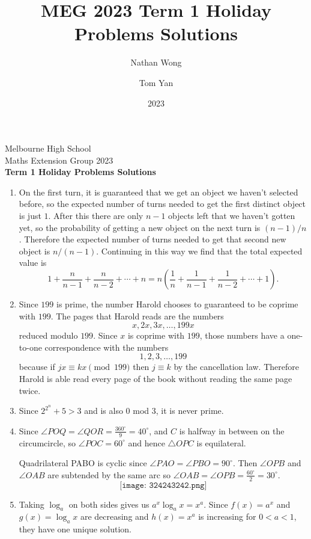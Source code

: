 \documentclass[a4paper]{article}
\title{MEG 2023 Term 1 Holiday Problems Solutions}
\author{Nathan Wong\and Tom Yan}
\date{2023}
\begin{document}
\noindent Melbourne High School\\
Maths Extension Group 2023\\
\textbf{Term 1 Holiday Problems Solutions}\\

\begin{enumerate}
\item On the first turn, it is guaranteed that we get an object we haven't selected before, so the expected number of turns needed to get the
  first distinct object is just \(1\). After this there are only \(n-1\) objects left that we haven't gotten yet, so the probability of getting
  a new object on the next turn is \((n-1)/n\). Therefore the expected number of turns needed to get that second new object is \(n/(n-1)\). Continuing
  in this way we find that the total expected value is \[1+\frac{n}{n-1}+\frac{n}{n-2}+\cdots+n=n\left(\frac{1}{n}+\frac{1}{n-1}+\frac{1}{n-2}+\cdots+1\right).\]
\item Since \(199\) is prime, the number Harold chooses to guaranteed to be coprime with \(199\). The pages that Harold reads are the numbers
  \[ x,2x,3x,\ldots,199x\] reduced modulo \(199\). Since \(x\) is coprime with \(199\), those numbers have a one-to-one correspondence with
  the numbers \[1,2,3,\ldots,199\] because if \(jx\equiv kx\pmod{199}\) then \(j\equiv k\) by the cancellation law. Therefore Harold is able
  read every page of the book without reading the same page twice.
\item Since $2^{2^n}+5>3$ and is also 0 mod 3, it is never prime.
\item Since $\angle POQ = \angle QOR = \frac{360^{\circ}}{9}=40^{\circ}$, and $C$ is halfway in between on the circumcircle, so $\angle POC = 60^{\circ}$ and hence $\triangle OPC$ is equilateral.

  Quadrilateral PABO is cyclic since $\angle PAO = \angle PBO = 90^{\circ}$. Then $\angle OPB$ and $\angle OAB$ are subtended by the same arc so $\angle OAB = \angle OPB = \frac{60^{\circ}}{2} = 30^{\circ}$. 
\[{\texttt{[image: 324243242.png]}}\]
\item Taking $\log_a$ on both sides gives us $a^x\log_a{x}=x^a$. Since $f(x)=a^x$ and $g(x)=\log_a{x}$ are decreasing and $h(x)=x^a$ is increasing for $0<a<1$, they have one unique solution.


\end{enumerate}
\end{document}
